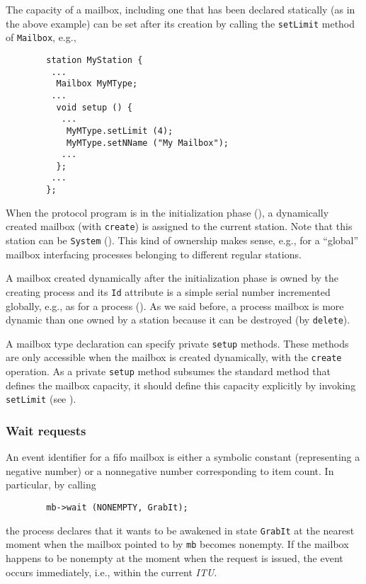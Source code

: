 The capacity of a mailbox, including one that has been
declared statically (as in the above example)
can be set after its creation by calling the
{\tt setLimit} method of {\tt Mailbox}, e.g.,
\begin{verbatim}
        station MyStation {
         ...
          Mailbox MyMType;
         ...
          void setup () {
           ...
            MyMType.setLimit (4);
            MyMType.setNName ("My Mailbox");
           ...
          };
         ...
        };
\end{verbatim}

When the protocol program is in the initialization phase
(), a dynamically created mailbox (with {\tt create})
is assigned to the current station.
Note that this station can be {\tt System} ().
This kind of ownership makes sense, e.g., for a ``global'' mailbox
interfacing processes belonging to different regular stations.

A mailbox created dynamically after the initialization phase
is owned by the creating process and its {\tt Id} attribute
is a simple serial number incremented globally, e.g., as
for a process ().
As we said before, a process mailbox is more dynamic than one owned by a
station because it can be destroyed (by {\tt delete}).

A mailbox type declaration can specify private {\tt setup} methods.
These methods are only accessible when the mailbox is created dynamically,
with the {\tt create} operation.
As a private {\tt setup} method subsumes the standard method that defines
the mailbox capacity, it should define this capacity explicitly
by invoking {\tt setLimit} (see ).

\subsubsection{Wait requests}
\label{rm_mb_fi_wr}

An event identifier for a fifo mailbox is either a symbolic constant
(representing a negative number) or a nonnegative number corresponding
to item count.
In particular, by calling
\begin{verbatim}
        mb->wait (NONEMPTY, GrabIt);
\end{verbatim}
the process declares that it
wants to be awakened in state {\tt GrabIt} at the nearest
moment when the mailbox pointed to by {\tt mb} becomes nonempty.
If the mailbox happens to be nonempty at the moment when the request is
issued, the event occurs immediately, i.e., within the current {\em ITU}.

